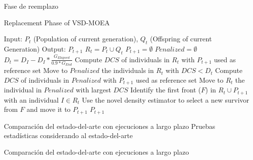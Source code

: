 \documentclass{beamer}
\begin{document}
\begin{frame}{Fase de reemplazo}
  \begin{algorithm}[H]
  \begin{scriptsize}
	\caption{Replacement Phase of VSD-MOEA} 

\begin{algorithmic}[1]
\STATE Input: $P_t$ (Population of current generation), $Q_t$ (Offspring of current Generation)
    	\STATE Output: $P_{t+1}$ 
        \STATE $R_t = P_t \cup Q_t$ \label{alg:1}
        \STATE $P_{t+1} = \emptyset$ \label{alg:2}
        \STATE $Penalized = \emptyset$ \label{alg:3}
				\STATE $D_t = D_I - D_I * \frac{G_{Elapsed}}{0.9*G_{End}}$ \label{alg:4}
         \label{alg:6}
					\STATE Compute $DCS$ of individuals in $R_t$ with $P_{t+1}$ used as reference set \label{alg:7}
					\STATE Move to $Penalized$ the individuals in $R_t$ with $DCS < D_t$  \label{alg:8}
        	 \label{alg:9}
						\STATE Compute $DCS$ of individuals in $Penalized$ with $P_{t+1}$ used as reference set \label{alg:10}
						\STATE Move to $R_t$ the individual in $Penalized$ with largest $DCS$ \label{alg:11}
        	\ENDIF
					\STATE Identify the first front ($F$) in $R_t \cup P_{t+1}$ with an individual $I \in R_t$ \label{alg:12}
					\STATE Use the novel density estimator  to select a new survivor 
					from $F$ and move it to $P_{t+1}$\label{alg:13}
        \ENDWHILE
    	\RETURN $P_{t+1}$ \label{alg:14}
	\end{algorithmic}

\label{alg:Replacement_Phase}
\end{scriptsize}
\end{algorithm}
\end{frame}


\begin{frame}{Comparación del estado-del-arte con ejecuciones a largo plazo}
Pruebas estadísticas considerando al estado-del-arte


\end{frame}

\begin{frame}{Comparación del estado-del-arte con ejecuciones a largo plazo}

\end{frame}
\end{document}
